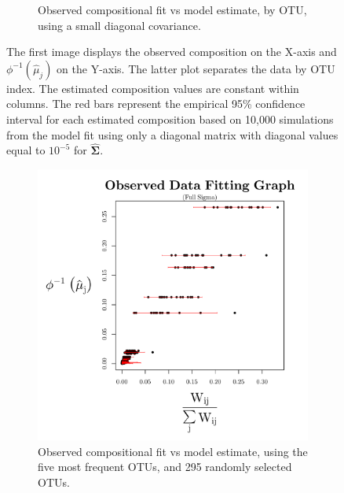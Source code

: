 \documentclass{template}
\begin{document}
\begin{figure}[ht!]
\begin{subfigure}[b]{0.38\textheight}
        \caption{Observed compositional fit vs model estimate, by OTU, using a small diagonal covariance.}
    \end{subfigure}
    \caption{The first image displays the observed composition on the X-axis and $\phi^{-1}(\hat{\mu}_j)$ on the Y-axis. The latter plot separates the data by OTU index. The estimated composition values are constant within columns. The red bars represent the empirical 95\% confidence interval for each estimated composition based on 10,000 simulations from the model fit using only a diagonal matrix with diagonal values equal to $10^{-5}$ for $\hat{\boldsymbol{\Sigma}}$.}\label{fig:compFitBarSmall}
\end{figure}

\clearpage 

\begin{figure}[ht!]
    \centering
    \begin{subfigure}[b]{0.38\textheight}
        \includegraphics[width=\textwidth]{Images/XiaPlotBars295v5.pdf}
        \caption{Observed compositional fit vs model estimate, using the five most frequent OTUs, and 295 randomly selected OTUs.}
    \end{subfigure}
\\
    \begin{subfigure}[b]{0.34\textheight}

\end{subfigure}
\end{figure}
\end{document}
